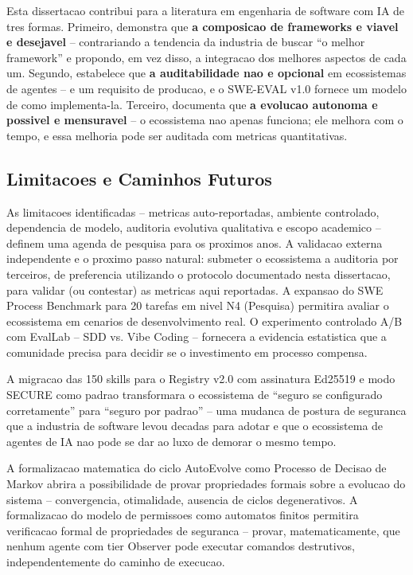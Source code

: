 \documentclass[12pt,a4paper,oneside,sumario=tradicional,chapter=TITLE,section=TITLE,subsection=TITLE,english,brazil]{abntex2}
\begin{document}
Esta dissertacao contribui para a literatura em engenharia de software com IA de tres formas. Primeiro, demonstra que \textbf{a composicao de frameworks e viavel e desejavel} -- contrariando a tendencia da industria de buscar ``o melhor framework'' e propondo, em vez disso, a integracao dos melhores aspectos de cada um. Segundo, estabelece que \textbf{a auditabilidade nao e opcional} em ecossistemas de agentes -- e um requisito de producao, e o SWE-EVAL v1.0 fornece um modelo de como implementa-la. Terceiro, documenta que \textbf{a evolucao autonoma e possivel e mensuravel} -- o ecossistema nao apenas funciona; ele melhora com o tempo, e essa melhoria pode ser auditada com metricas quantitativas.

\subsection{Limitacoes e Caminhos Futuros}

As limitacoes identificadas -- metricas auto-reportadas, ambiente controlado, dependencia de modelo, auditoria evolutiva qualitativa e escopo academico -- definem uma agenda de pesquisa para os proximos anos. A validacao externa independente e o proximo passo natural: submeter o ecossistema a auditoria por terceiros, de preferencia utilizando o protocolo documentado nesta dissertacao, para validar (ou contestar) as metricas aqui reportadas. A expansao do SWE Process Benchmark para 20 tarefas em nivel N4 (Pesquisa) permitira avaliar o ecossistema em cenarios de desenvolvimento real. O experimento controlado A/B com EvalLab -- SDD vs. Vibe Coding -- fornecera a evidencia estatistica que a comunidade precisa para decidir se o investimento em processo compensa.

A migracao das 150 skills para o Registry v2.0 com assinatura Ed25519 e modo SECURE como padrao transformara o ecossistema de ``seguro se configurado corretamente'' para ``seguro por padrao'' -- uma mudanca de postura de seguranca que a industria de software levou decadas para adotar e que o ecossistema de agentes de IA nao pode se dar ao luxo de demorar o mesmo tempo.

A formalizacao matematica do ciclo AutoEvolve como Processo de Decisao de Markov abrira a possibilidade de provar propriedades formais sobre a evolucao do sistema -- convergencia, otimalidade, ausencia de ciclos degenerativos. A formalizacao do modelo de permissoes como automatos finitos permitira verificacao formal de propriedades de seguranca -- provar, matematicamente, que nenhum agente com tier Observer pode executar comandos destrutivos, independentemente do caminho de execucao.
\end{document}
